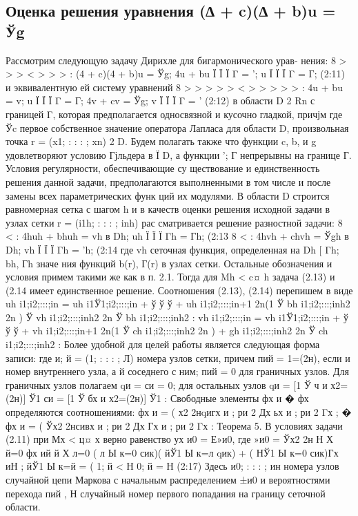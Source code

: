 \subsection{Оценка решения уравнения (∆ + c)(∆ + b)u = Ўg}
Рассмотрим следующую задачу Дирихле для бигармонического урав-
нения: 8
> > > <
> > > :
(4 + c)(4 + b)u = Ўg;
4u + bu
Ї
Ї
Ї
Γ = ';
u
Ї
Ї
Ї
Γ = Г;
(2:11)
и эквивалентную ей систему уравнений
8
> > > > > <
> > > > > :
4u + bu = v;
u
Ї
Ї
Ї
Γ = Г;
4v + cv = Ўg;
v
Ї
Ї
Ї
Γ = '
(2:12)
в области D 2 Rn с границей Γ, которая предполагается односвязной и
кусочно гладкой, причјм где Ўc  первое собственное значение оператора Лапласа для области
D, произвольная точка r = (x1; : : : ; xn) 2 D. Будем полагать также что
функции c, b, и g удовлетворяют условию Гјльдера в Ї D, а функции '; Г
непрерывны на границе Г. Условия регулярности, обеспечивающие су
ществование и единственность решения данной задачи, предполагаются
выполненными в том числе и после замены всех параметрических функ
ций их модулями.
В области D строится равномерная сетка с шагом h и в качеств
оценки решения исходной задачи в узлах сетки r = (i1h; : : : ; inh) рас
сматривается решение разностной задачи:
8
<
:
4huh + bhuh = vh в Dh;
uh
Ї
Ї
Ї
Γh
= Гh;
(2:13
8
<
:
4hvh + chvh = Ўgh в Dh;
vh
Ї
Ї
Ї
Γh
= 'h;
(2:14
где vh  сеточная функция, определенная на Dh [ Γh; bh, Гh  значе
ния функций b(r), Г(r) в узлах сетки. Остальные обозначения и условия
примем такими же как в п. 2.1. Тогда для Mh < c¤
h задача (2.13) и (2.14
имеет единственное решение.
Соотношения (2.13), (2.14) перепишем в виде
uh
i1;i2;:::;in =
uh
i1Ў1;i2;:::;in + ў ў ў + uh
i1;i2;:::;in+1
2n(1 Ў bh
i1;i2;:::;inh2
2n )
Ў
vh
i1;i2;:::;inh2
2n Ў bh
i1;i2;:::;inh2
:
vh
i1;i2;:::;in =
vh
i1Ў1;i2;:::;in + ў ў ў + vh
i1;i2;:::;in+1
2n(1 Ў ch
i1;i2;:::;inh2
2n )
+
gh
i1;i2;:::;inh2
2n Ў ch
i1;i2;:::;inh2
:
Более удобной для целей работы является следующая форма записи:
где и; й = (1; : : : ; Л)  номера узлов сетки, причем пий = 1=(2н), если и 
номер внутреннего узла, а й  соседнего с ним; пий = 0 для граничных
узлов. Для граничных узлов полагаем qи = си = 0; для остальных узлов
qи = [1 Ў ч
и х2=(2н)]
Ў1
си = [1 Ў бх
и х2=(2н)]
Ў1
:
Свободные элементы фх и � фх определяются соотношениями:
фх
и =
( х2
2нqигх
и ; ри 2 Дх
ьх
и ; ри 2 Γх
; � фх
и =
(
Ўх2
2нсивх
и ; ри 2 Дх
Гх
и ; ри 2 Γх
:
Теорема 5. В условиях задачи (2.11) при Мх < ц¤
х верно равенство
ух
и0 = Е»и0, где
»и0 = Ўх2
2н
Н Х
й=0
фх
ий
й Х
л=0
(
л Ы
к=0
сик)(
йЎ1 Ы
к=л
qик) + (
НЎ1 Ы
к=0
сик)Гх
иН ;
йЎ1 Ы
к=й
=
(
1; й < Н
0; й = Н
(2:17)
Здесь и0; : : : ; ин  номера узлов случайной цепи Маркова с начальным
распределением ±и0 и вероятностями перехода пий , Н  случайный номер
первого попадания на границу сеточной области.

